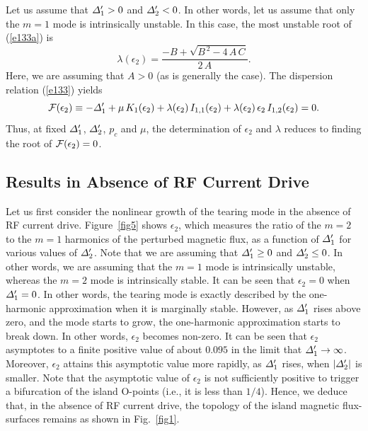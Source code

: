 \documentclass[12pt,prb,aps]{revtex4-1}
\begin{document}
Let us assume that ${\mit\Delta}_1'>0$ and ${\mit\Delta}_2'< 0$. In other words, let us assume that only the
$m=1$ mode is intrinsically unstable. In this case, the most unstable root of (\ref{e133a}) is
\begin{equation}
\lambda(\epsilon_2) = \frac{-B +\sqrt{B^{\,2}-4\,A\,C}}{2\,A}.
\end{equation}
Here, we are assuming that $A>0$ (as is generally the case). The dispersion relation (\ref{e133})  yields
\begin{equation}
{\cal F}(\epsilon_2)\equiv -{\mit\Delta}_1'+\mu\,K_1(\epsilon_2)+\lambda(\epsilon_2)\,I_{1,1}(\epsilon_2)+\lambda(\epsilon_2)\,\epsilon_2\,I_{1,2}(\epsilon_2) = 0.
\end{equation}
Thus, at fixed ${\mit\Delta}_1'$, ${\mit\Delta}_2'$, $p_c$ and $\mu$, the determination of $\epsilon_2$ and $\lambda$ reduces to finding the root of ${\cal F}(\epsilon_2)=0$. 

\subsection{Results in Absence of RF Current Drive}
Let us first consider the nonlinear growth of the tearing mode in the absence of RF current drive. Figure~\ref{fig5}
shows $\epsilon_2$, which measures the ratio of the $m=2$ to the $m=1$ harmonics of the perturbed magnetic flux,  as a function of ${\mit\Delta}_1'$ for various values of
${\mit\Delta}_2'$. Note that we are assuming that ${\mit\Delta}_1'\geq 0$ and ${\mit\Delta}_2'\leq 0$. In other words, we are assuming  that
the $m=1$ mode is intrinsically unstable, whereas the $m=2$ mode is intrinsically stable. It can be seen that $\epsilon_2=0$
when ${\mit\Delta}_1'=0$. In other words, the tearing mode is exactly described by the one-harmonic approximation
when it is marginally stable. However, as ${\mit\Delta}_1'$ rises above zero, and the mode starts to grow, the one-harmonic approximation starts to break down. In other words, $\epsilon_2$ becomes non-zero. It can be seen that $\epsilon_2$ asymptotes to a finite positive value of about $0.095$ in the limit that 
${\mit\Delta}_1'\rightarrow \infty$. Moreover, $\epsilon_2$ attains this asymptotic value more rapidly, as ${\mit\Delta}_1'$ rises, 
when $|{\mit\Delta}_2'|$ is smaller. 
Note that the asymptotic value of $\epsilon_2$ is not 
sufficiently positive  to trigger a bifurcation of the island O-points (i.e., it is less than $1/4$). Hence, we deduce that, in the absence of RF current drive,  the topology of the island
magnetic flux-surfaces remains as shown in Fig.~\ref{fig1}. 
\end{document}
